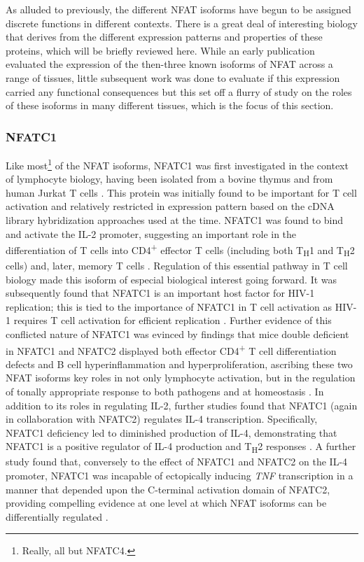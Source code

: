 As alluded to previously, the different NFAT isoforms have begun to be assigned discrete functions in different contexts. There is a great deal of interesting biology that derives from the different expression patterns and properties of these proteins, which will be briefly reviewed here. While an early publication \citep{Masuda1995} evaluated the expression of the then\hyp{}three known isoforms of NFAT across a range of tissues, little subsequent work was done to evaluate if this expression carried any functional consequences but this set off a flurry of study on the roles of these isoforms in many different tissues, which is the focus of this section. 

\subsubsection{NFATC1}\label{nfatc1}

Like most\footnote{Really, all but NFATC4.} of the NFAT isoforms, NFATC1 was first investigated in the context of lymphocyte biology, having been isolated from a bovine thymus and from human Jurkat T cells \citep{Northrop1994}. This protein was initially found to be important for T cell activation and relatively restricted in expression pattern based on the cDNA library hybridization approaches used at the time. NFATC1 was found to bind and activate the IL\hyp{}2 promoter, suggesting an important role in the differentiation of T cells into CD4\textsuperscript{+} effector T cells (including both T\textsubscript{H}1 and T\textsubscript{H}2 cells) and, later, memory T cells \citep{Martinez2015, Monticelli2002, YahiaCherbal2019, Torgerson2009, KleinHessling2017, Oestreich2008}. Regulation of this essential pathway in T cell biology made this isoform of especial biological interest going forward. It was subsequently found that NFATC1 is an important host factor for HIV\hyp{}1 replication; this is tied to the importance of NFATC1 in T cell activation as HIV\hyp{}1 requires T cell activation for efficient replication \citep{Kinoshita1997}. Further evidence of this conflicted nature of NFATC1 was evinced by findings that mice double deficient in NFATC1 and NFATC2 displayed both effector CD4\textsuperscript{+} T cell differentiation defects and B cell hyperinflammation and hyperproliferation, ascribing these two NFAT isoforms key roles in not only lymphocyte activation, but in the regulation of tonally appropriate response to both pathogens and at homeostasis \citep{Peng2001}. In addition to its roles in regulating IL\hyp{}2, further studies found that NFATC1 (again in collaboration with NFATC2) regulates IL\hyp{}4 transcription. Specifically, NFATC1 deficiency led to diminished production of IL\hyp{}4, demonstrating that NFATC1 is a positive regulator of IL\hyp{}4 production and T\textsubscript{H}2 responses \citep{Monticelli2002}. A further study found that, conversely to the effect of NFATC1 and NFATC2 on the IL\hyp{}4 promoter, NFATC1 was incapable of ectopically inducing \textit{TNF} transcription in a manner that depended upon the C\hyp{}terminal activation domain of NFATC2, providing compelling evidence at one level at which NFAT isoforms can be differentially regulated \citep{Kaminuma2008}.

